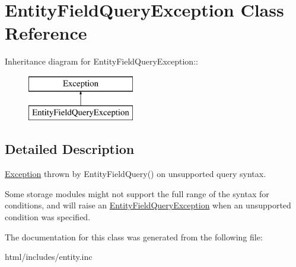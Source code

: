 \hypertarget{classEntityFieldQueryException}{
\section{EntityFieldQueryException Class Reference}
\label{classEntityFieldQueryException}
}
Inheritance diagram for EntityFieldQueryException::\begin{figure}[H]
\begin{center}
\leavevmode
\includegraphics[height=2cm]{classEntityFieldQueryException}
\end{center}
\end{figure}


\subsection{Detailed Description}
\hyperlink{classException}{Exception} thrown by EntityFieldQuery() on unsupported query syntax.

Some storage modules might not support the full range of the syntax for conditions, and will raise an \hyperlink{classEntityFieldQueryException}{EntityFieldQueryException} when an unsupported condition was specified. 

The documentation for this class was generated from the following file:\begin{DoxyCompactItemize}
\item 
html/includes/entity.inc\end{DoxyCompactItemize}

